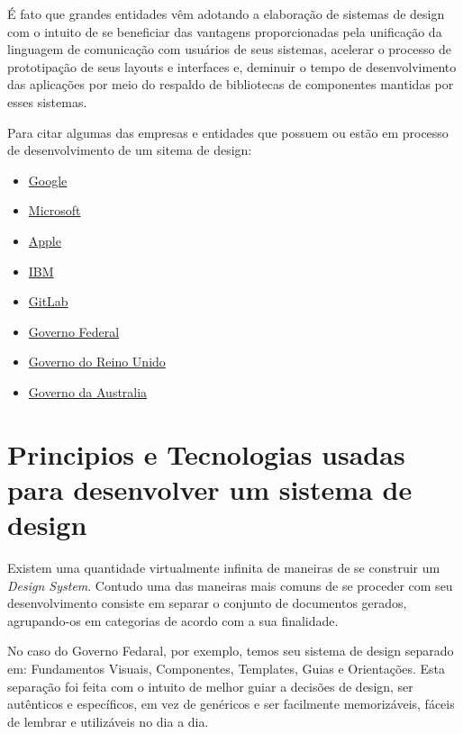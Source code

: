   É fato que grandes entidades vêm adotando a elaboração de sistemas de design com o intuito de se beneficiar das vantagens proporcionadas pela unificação da linguagem de comunicação com usuários de seus sistemas, acelerar o processo de prototipação de seus layouts e interfaces e, deminuir o tempo de desenvolvimento das aplicações por meio do respaldo de bibliotecas de componentes mantidas por esses sistemas.

  Para citar algumas das empresas e entidades que possuem ou estão em processo de desenvolvimento de um sitema de design:

\begin{itemize}
  \item \href{https://material.io/design/}{Google}
  \item \href{https://www.microsoft.com/design/fluent/#/}{Microsoft}
  \item \href{https://developer.apple.com/design/}{Apple}
  \item \href{https://www.carbondesignsystem.com/}{IBM}
  \item \href{https://www.figma.com/community/plugin/860845891704482356/GitLab}{GitLab}
  \item \href{https://www.gov.br/governodigital/pt-br/transformacao-digital/ferramentas/design-system}{Governo Federal}
  \item \href{https://www.gov.uk/guidance/government-design-principles}{Governo do Reino Unido }
  \item \href{https://designsystem.gov.au/}{Governo da Australia}
\end{itemize}

\section{Principios e Tecnologias usadas para desenvolver um sistema de design}

  Existem uma quantidade virtualmente infinita de maneiras de se construir um \textit{Design System}. Contudo uma das maneiras mais comuns de se proceder com seu desenvolvimento consiste em separar o conjunto de documentos gerados, agrupando-os em categorias de acordo com a sua finalidade.

  No caso do Governo Fedaral, por exemplo, temos seu sistema de design separado em: Fundamentos Visuais, Componentes, Templates, Guias e Orientações. Esta separação foi feita com o intuito de melhor guiar a decisões de design, ser autênticos e específicos, em vez de genéricos e ser facilmente memorizáveis, fáceis de lembrar e utilizáveis no dia a dia. \cite{design_gov_federal}

